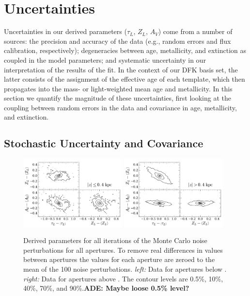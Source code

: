 \section{Uncertainties}
\label{891_2:sec:uncertainty}

Uncertainties in our derived parameters ($\tau_L$, $Z_L$, $A_V$) come
from a number of sources: the precision and accuracy of the data
(e.g., random errors and flux calibration, respectively); degeneracies
between age, metallicity, and extinction as coupled in the model
parameters; and systematic uncertainty in our interpretation of the
results of the fit. In the context of our DFK basis set, the latter
consists of the assignment of the effective age of each template,
which then propagates into the mass- or light-weighted mean age and
metallicity.  In this section we quantify the magnitude of these
uncertainties, first looking at the coupling between random errors in
the data and covariance in age, metallicity, and extinction.
 

\subsection{Stochastic Uncertainty and Covariance}
\label{891_2:sec:fit_err}

\begin{figure}
  \centering
  \includegraphics[width=0.48\textwidth]{891_2/figs/MC_covarcont_below.pdf}
  \includegraphics[width=0.48\textwidth]{891_2/figs/MC_covarcont_above.pdf}
  \caption[Covariance between uncertainties in $\tau_L$, $Z_L$, and
    $A_V$]{\fixspacing\label{891_2:fig:MC_covar}Derived parameters for
    all iterations of the Monte Carlo noise perturbations for all
    apertures. To remove real differences in values between apertures
    the values for each aperture are zeroed to the mean of the 100
    noise perturbations. \emph{left:} Data for apertures below
    . \emph{right:} Data for apertures above
    . The contour levels are 0.5\%, 10\%, 40\%, 70\%,
    and 90\%.{\bf ADE: Maybe loose 0.5\% level?} }
\end{figure}

